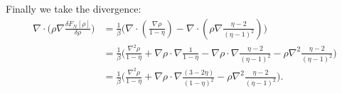 Finally we take the divergence:
\begin{align*}
	\nabla \cdot \bigg(\rho \nabla \frac{\delta F_{N}[\rho]}{\delta \rho}\bigg) &= \frac{1}{\beta} \bigg( \nabla  \cdot \left(  \frac{\nabla \rho}{1 - \eta} \right) - \nabla  \cdot \left(\rho \nabla\frac{\eta - 2}{(\eta - 1)^2} \right) \bigg)\\
	&= \frac{1}{\beta} \bigg( \frac{\nabla^2 \rho}{1 - \eta} +  \nabla \rho \cdot \nabla \frac{1}{1 - \eta} - \nabla \rho \cdot \nabla \frac{\eta - 2}{(\eta - 1)^2} - \rho \nabla^2\frac{\eta - 2}{(\eta - 1)^2} \bigg)\\
	&= \frac{1}{\beta} \bigg( \frac{\nabla^2 \rho}{1 - \eta} +  \nabla \rho \cdot \nabla \frac{(3- 2 \eta)}{(1 - \eta)^2}  - \rho \nabla^2\frac{\eta - 2}{(\eta - 1)^2} \bigg).
\end{align*}